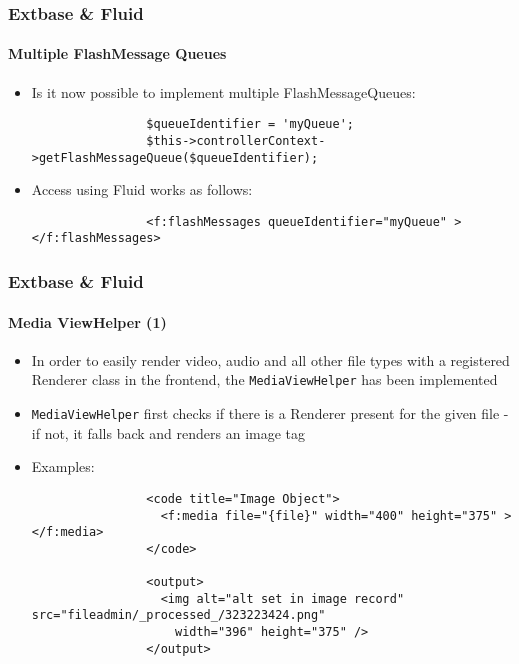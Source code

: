 \begin{frame}[fragile]
	\frametitle{Extbase \& Fluid}
	\framesubtitle{Multiple FlashMessage Queues}

	\begin{itemize}

		\item Is it now possible to implement multiple FlashMessageQueues:

			\begin{lstlisting}
				$queueIdentifier = 'myQueue';
				$this->controllerContext->getFlashMessageQueue($queueIdentifier);
			\end{lstlisting}

		\item Access using Fluid works as follows:

			\begin{lstlisting}
				<f:flashMessages queueIdentifier="myQueue" ></f:flashMessages>
			\end{lstlisting}

	\end{itemize}

\end{frame}


\begin{frame}[fragile]
	\frametitle{Extbase \& Fluid}
	\framesubtitle{Media ViewHelper (1)}

	\lstset{basicstyle=\tiny\ttfamily}

	\begin{itemize}

		\item In order to easily render video, audio and all other file types with
			a registered Renderer class in the frontend, the \texttt{MediaViewHelper}
			has been implemented

		\item \texttt{MediaViewHelper} first checks if there is a Renderer present for
			the given file - if not, it falls back and renders an image tag

		\item Examples:

			\begin{lstlisting}
				<code title="Image Object">
				  <f:media file="{file}" width="400" height="375" ></f:media>
				</code>

				<output>
				  <img alt="alt set in image record" src="fileadmin/_processed_/323223424.png"
				    width="396" height="375" />
				</output>
			\end{lstlisting}

	\end{itemize}

\end{frame}

